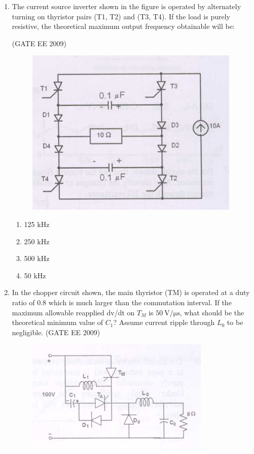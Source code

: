 \documentclass[journal,12pt,onecolumn]{IEEEtran}
\theoremstyle{remark}
\begin{document}
\begin{flushleft}
\begin{enumerate}
\item The current source inverter shown in the figure is operated by alternately turning on thyristor pairs (T1, T2) and (T3, T4). If the load is purely resistive, the theoretical maximum output frequency obtainable will be:

\hfill(GATE EE 2009)
\begin{figure}[H]
    \centering
  \includegraphics[width=0.7\columnwidth]{figs/Screenshot 2025-08-08 215620.png}
     \caption{}
    \label{fig:placeholder}
\end{figure}
  

\begin{enumerate}
    \item 125 kHz
    \item 250 kHz
    \item 500 kHz
    \item 50 kHz
\end{enumerate}


\item In the chopper circuit shown, the main thyristor (TM) is operated at a duty ratio of 0.8 which is much larger than the commutation interval.
If the maximum allowable reapplied dv/dt on \(T_M\) is \(50~\mathrm{V/\mu s}\), what should be the theoretical minimum value of \(C_1\)?
Assume current ripple through \(L_0\) to be negligible.
\hfill(GATE EE 2009)
\begin{figure}[h!]
    \centering
    \includegraphics[width=0.5\columnwidth]{figs/Screenshot 2025-08-09 101310.png}
    \label{fig:13}
\end{figure}


\end{enumerate}
\end{flushleft}
\end{document}
